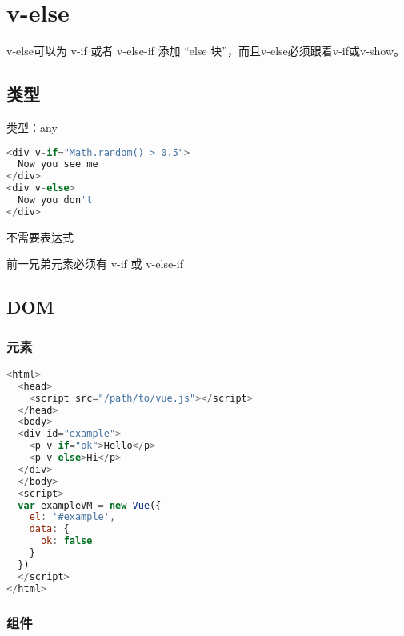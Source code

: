 \begin{lstlisting}[language=JavaScript]

\end{lstlisting}

\chapter{v-else}

v-else可以为 v-if 或者 v-else-if 添加 “else 块”，而且v-else必须跟着v-if或v-show。


\section{类型}

\begin{compactitem}
\item 类型：any
\end{compactitem}


\begin{lstlisting}[language=JavaScript]
<div v-if="Math.random() > 0.5">
  Now you see me
</div>
<div v-else>
  Now you don't
</div>
\end{lstlisting}

\begin{compactitem}
\item 不需要表达式
\item 前一兄弟元素必须有 v-if 或 v-else-if
\end{compactitem}


\section{DOM}

\subsection{元素}


\begin{lstlisting}[language=JavaScript]
<html>
  <head>
    <script src="/path/to/vue.js"></script>
  </head>
  <body>
  <div id="example">
    <p v-if="ok">Hello</p>
    <p v-else>Hi</p>
  </div>
  </body>
  <script>
  var exampleVM = new Vue({
    el: '#example',
    data: {
      ok: false
    }
  })
  </script>
</html>
\end{lstlisting}


\subsection{组件}


